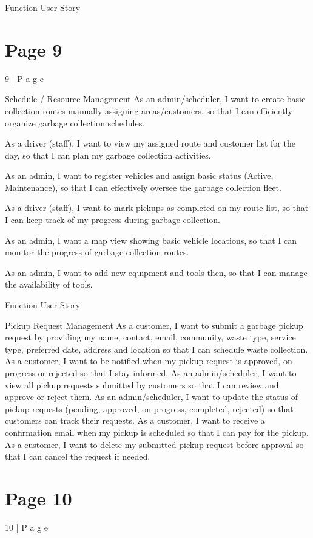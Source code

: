 \documentclass{article}
\begin{document}
 
  Function  User Story  

\section*{Page 9}
9 | P a g e 
 
 
Schedule / Resource 
Management 
 As an admin/scheduler, I want to create basic collection routes 
manually assigning areas/customers, so that I can efficiently 
organize garbage collection schedules.  
  
As a driver (staff), I want to view my assigned route and customer 
list for the day, so that I can plan my garbage collection activities.  
  
As an admin, I want to register vehicles and assign basic status 
(Active, Maintenance), so that I can effectively oversee the 
garbage collection fleet.  
  
As a driver (staff), I want to mark pickups as completed on my 
route list, so that I can keep track of my progress during garbage 
collection.  
  
As an admin, I want a map view showing basic vehicle locations, so 
that I can monitor the progress of garbage collection routes.  
  
As an admin, I want to add new equipment and tools then, so that 
I can manage the availability of tools.  
 
 
 
  Function  User Story  
 
Pickup Request 
Management 
As a customer, I want to submit a garbage pickup request by 
providing my name, contact, email, community, waste type, service 
type, preferred date, address and location so that I can schedule 
waste collection.  
As a customer, I want to be notified when my pickup request is 
approved, on progress or rejected so that I stay informed.  
As an admin/scheduler, I want to view all pickup requests 
submitted by customers so that I can review and approve or reject 
them.  
As an admin/scheduler, I want to update the status of pickup 
requests (pending, approved, on progress, completed, rejected) so 
that customers can track their requests.  
As a customer, I want to receive a confirmation email when my 
pickup is scheduled so that I can pay for the pickup.  
As a customer, I want to delete my submitted pickup request 
before approval so that I can cancel the request if needed.  

\section*{Page 10}
10 | P a g e 
 
\end{document}
